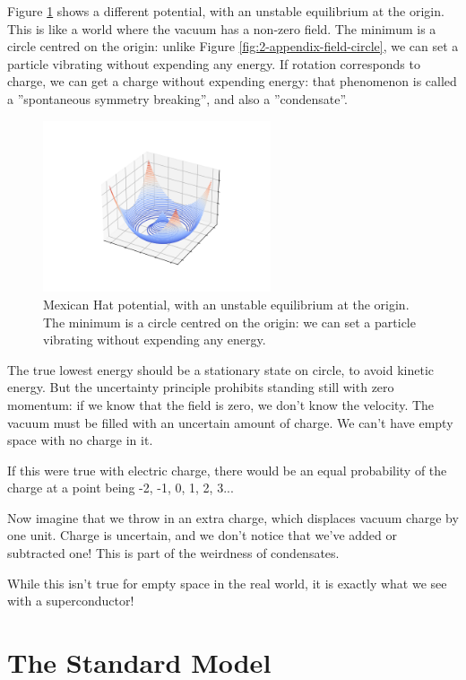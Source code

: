 \documentclass[]{article}
\begin{document}
Figure \ref{fig:mexican-hat} shows a different potential, with an unstable equilibrium at the origin. This is like a world where the vacuum has a non-zero field. The minimum is a circle centred on the origin: unlike Figure \ref{fig:2-appendix-field-circle}, we can set a particle vibrating without expending any energy. If rotation corresponds to charge, we can get a charge without expending energy: that phenomenon is called a ''spontaneous symmetry breaking'', and also a ''condensate''.
\begin{figure}[H]
	\begin{center}
		\caption[Mexican Hat potential]{Mexican Hat potential, with an unstable equilibrium at the origin.  The minimum is a circle centred on the origin: we can set a particle vibrating without expending any energy.}\label{fig:mexican-hat}
		\includegraphics[width=0.6\textwidth]{mexican-hat}
	\end{center}
\end{figure}

The true lowest energy should be a stationary state on circle, to avoid kinetic energy. But the uncertainty principle prohibits standing still with zero momentum: if we know that the field is zero, we don't know the velocity. The vacuum must be filled with an uncertain amount of charge.  We can't have empty space with no charge in it.

If this were true with electric charge, there would be an equal probability of the charge at a point being -2, -1, 0, 1, 2, 3...

Now imagine that we throw in an extra charge, which displaces vacuum charge by one unit. Charge is uncertain, and we don't notice that we've added or subtracted one! This is part of the weirdness of condensates.

While this isn't true for empty space in the real world, it is exactly what we see with a superconductor!

\section{The Standard Model}
\end{document}
